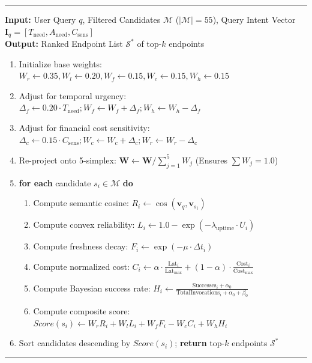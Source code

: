\documentclass[fleqn,10pt]{article}
\begin{document}
\begin{minipage}{\textwidth}
\vspace{0.5em}
\vspace{0.4em}
\hrule
\vspace{0.4em}
\textbf{Input:} User Query $q$, Filtered Candidates $\mathcal{M}$ ($|\mathcal{M}| = 55$), Query Intent Vector $\mathbf{I}_q = [T_{\text{need}}, A_{\text{need}}, C_{\text{sens}}]$\\
\textbf{Output:} Ranked Endpoint List $\mathcal{S}^*$ of top-$k$ endpoints
\begin{enumerate}[leftmargin=2em,noitemsep]
    \item Initialize base weights: $W_r \leftarrow 0.35, W_l \leftarrow 0.20, W_f \leftarrow 0.15, W_c \leftarrow 0.15, W_h \leftarrow 0.15$
    \item Adjust for temporal urgency: $\Delta_f \leftarrow 0.20 \cdot T_{\text{need}}; W_f \leftarrow W_f + \Delta_f; W_h \leftarrow W_h - \Delta_f$
    \item Adjust for financial cost sensitivity: $\Delta_c \leftarrow 0.15 \cdot C_{\text{sens}}; W_c \leftarrow W_c + \Delta_c; W_r \leftarrow W_r - \Delta_c$
    \item Re-project onto 5-simplex: $\mathbf{W} \leftarrow \mathbf{W} / \sum_{j=1}^5 W_j$ (Ensures $\sum W_j = 1.0$)
    \item \textbf{for each} candidate $s_i \in \mathcal{M}$ \textbf{do}
    \begin{enumerate}[leftmargin=1.5em,noitemsep]
        \item Compute semantic cosine: $R_i \leftarrow \cos(\mathbf{v}_q, \mathbf{v}_{s_i})$
        \item Compute convex reliability: $L_i \leftarrow 1.0 - \exp(-\lambda_{\text{uptime}} \cdot U_i)$
        \item Compute freshness decay: $F_i \leftarrow \exp(-\mu \cdot \Delta t_i)$
        \item Compute normalized cost: $C_i \leftarrow \alpha \cdot \frac{\text{Lat}_i}{\text{Lat}_{\max}} + (1-\alpha) \cdot \frac{\text{Cost}_i}{\text{Cost}_{\max}}$
        \item Compute Bayesian success rate: $H_i \leftarrow \frac{\text{Successes}_i + \alpha_0}{\text{TotalInvocations}_i + \alpha_0 + \beta_0}$
        \item Compute composite score: $Score(s_i) \leftarrow W_r R_i + W_l L_i + W_f F_i - W_c C_i + W_h H_i$
    \end{enumerate}
    \item Sort candidates descending by $Score(s_i)$; \textbf{return} top-$k$ endpoints $\mathcal{S}^*$
\end{enumerate}
\vspace{0.4em}
\hrule
\vspace{1.2em}
\end{minipage}
\end{document}
